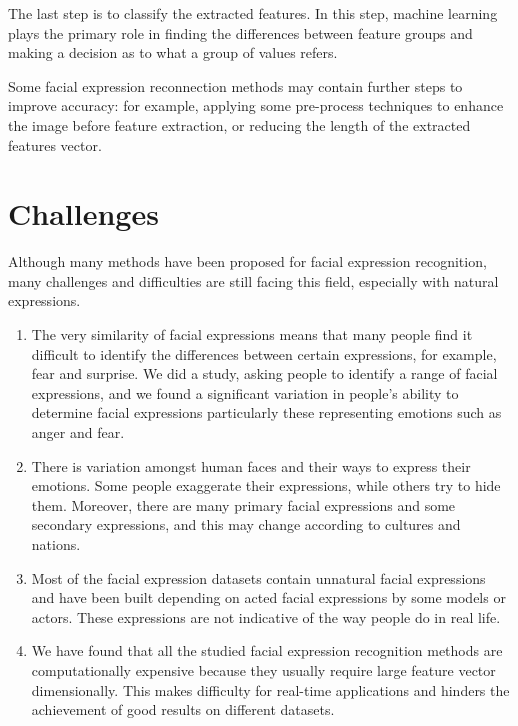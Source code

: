 The last step is to classify the extracted features. In this step, machine learning plays the primary role in finding the differences between feature groups and making a decision as to what a group of values refers. 

Some facial expression reconnection methods may contain further steps to improve accuracy: for example, applying some pre-process techniques to enhance the image before feature extraction, or reducing the length of the extracted features vector.  




\section{Challenges}
Although many methods have been proposed for facial expression recognition, many challenges and difficulties are still facing this field, especially with natural expressions.

\begin{enumerate}
	\item The very similarity of facial expressions means that many people find it difficult to identify the differences between certain expressions, for example, fear and surprise. We did a study,  asking people to identify a range of facial expressions, and we found a significant variation in people's ability to determine facial expressions particularly these representing emotions such as anger and fear.
	
	\item There is variation amongst human faces and their ways to express their emotions. Some people exaggerate their expressions, while others try to hide them. Moreover, there are many primary facial expressions and some secondary expressions, and this may change according to cultures and nations.
	
	\item Most of the facial expression datasets contain unnatural facial expressions and have been built depending on acted facial expressions by some models or actors. These expressions are not indicative of the way people do in real life.
	
	\item We have found that all the studied facial expression recognition methods are computationally expensive because they usually require large feature vector dimensionally. This makes difficulty for real-time applications and hinders the achievement of good results on different datasets.
\end{enumerate}



